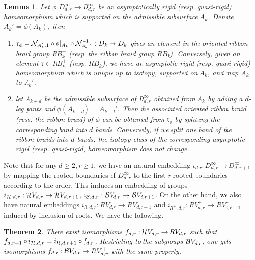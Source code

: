 \documentclass[11pt, a4paper]{amsart}
\newtheorem{thm}{Theorem}[section]
\newtheorem{lem}[thm]{Lemma}
\theoremstyle{definition}
\begin{document}
\begin{lem}\label{lem-home-brd}
Let  $\phi:D_{d,r}^\infty \to D_{d,r}^\infty$ be an asymptotically rigid (resp. quasi-rigid) homeomorphism which is supported on the admissible subsurface $A_k$. Denote $A_k' =\phi(A_k)$, then
\begin{enumerate}
    \item $\mathfrak{r}_\phi = {\mathcal {N}}_{A_k',1} \circ \phi|_{A_k} \circ {\mathcal {N}}_{A_k,1}^{-1}: D_k\to D_k$ gives an element in the oriented ribbon braid group $RB^+_k$ (resp. the ribbon braid group $RB_k$). Conversely, given an element $\mathfrak{r}\in RB^+_k$ (resp. $RB_k$), we have an asymptotic rigid (resp. quasi-rigid) homeomorphism which is unique up to isotopy,  supported on $A_k$,  and map $A_k$ to $A_k'$.
    
    \item let $A_{k+d}$ be the admissible subsurface of $D_{d,r}^\infty$ obtained from $A_k$ by adding a $d$-leg pants and $ \phi(A_{k+d})= A_{k+d}'$. Then the associated  oriented ribbon braid  (resp. the ribbon braid) of $\phi$ can be obtained from $\mathfrak{r}_{\phi}$ by splitting the corresponding band into $d$ bands. Conversely, if we split one band of the ribbon braids into $d$ bands, the isotopy class of the corresponding asymptotic  rigid (resp. quasi-rigid) homeomorphism does not change.  
\end{enumerate}
\end{lem} 




Note that for any $d\geq2,r\geq1$, we have an natural embedding $\iota_{{d,r}}: D_{d,r}^\infty \to D_{d,r+1}^\infty$ by mapping the rooted boundaries of $D_{d,r}^\infty $ to the first $r$ rooted boundaries according to the order. This induces an embedding of groups $i_{{\mathcal {H}},{d,r}}: {\mathcal {H}} V_{d,r} \to {\mathcal {H}} V_{d,r+1}$, $i_{{\mathcal {B}},{d,r}}: {\mathcal {B}} V_{d,r} \to {\mathcal {B}} V_{d,r+1}$.
On the other hand, we also have natural embeddings  $i_{R,d,r}: RV_{d,r} \to RV_{d,r+1} $ and $i_{ R^+,d,r} :  RV^+_{d,r} \to  RV^+_{d,r+1}$ induced by inclusion of roots. We have the following. 

 



\begin{thm}\label{thm-iden-asym-ribb}
     There exist isomorphisms $f_{d,r}:{\mathcal {H}} V_{d,r} \rightarrow RV_{d,r}$ such that $f_{d,r+1}  \circ i_{{\mathcal {H}},d,r}  = i_{{\mathcal {H}},d , r+1} \circ f_{d,r}$. Restricting to the subgroups ${\mathcal {B}} V_{d,r}$, one gets isomorphisms $f_{d,r}:{\mathcal {B}} V_{d,r} \rightarrow RV^+_{d,r}$ with the same property.
\end{thm}
\end{document}
